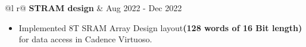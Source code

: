 \documentclass[a4paper,10pt]{article}
\begin{document}
\begin{tabularx}{\linewidth}{ @{}l r@{} }
    \textbf{STRAM design} & \hfill {\small Aug 2022 - Dec 2022} \\[2.75pt]
    {
        \begin{minipage}[t]{\linewidth}
            \begin{itemize}[nosep,after=\strut, leftmargin=2em, itemsep=3pt]
                \item Implemented 8T SRAM Array Design layout\textbf{(128 words of 16 Bit length)} for data access in Cadence Virtuoso. 
            \end{itemize}
        \end{minipage}
    }  
\end{tabularx}
\end{document}
